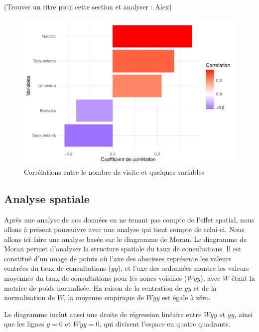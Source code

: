 \documentclass[
]{article}
\begin{document}
(Trouver un titre pour cette section et analyser : Alex)

\begin{figure}

{\centering \includegraphics{4_Analyse_Descriptive_files/figure-latex/unnamed-chunk-11-1} 

}

\caption{Corrélations entre le nombre de visite et quelques variables}\label{fig:unnamed-chunk-11}
\end{figure}

\subsection{Analyse spatiale}\label{analyse-spatiale}

Après une analyse de nos données en ne tenant pas compte de l'effet
spatial, nous allons à présent poursuivre avec une analyse qui tient
compte de celui-ci. Nous allons ici faire une analyse basée sur le
diagramme de Moran. Le diagramme de Moran permet d'analyser la structure
spatiale du taux de consultations. Il est constitué d'un nuage de points
où l'axe des abscisses représente les valeurs centrées du taux de
consultations (\(yy\)), et l'axe des ordonnées montre les valeurs
moyennes du taux de consultations pour les zones voisines (\(Wyy\)),
avec \(W\) étant la matrice de poids normalisée. En raison de la
centration de \(yy\) et de la normalisation de \(W\), la moyenne
empirique de \(Wyy\) est égale à zéro.

Le diagramme inclut aussi une droite de régression linéaire entre
\(Wyy\) et \(yy\), ainsi que les lignes \(y=0\) et \(Wyy=0\), qui
divisent l'espace en quatre quadrants.
\end{document}
